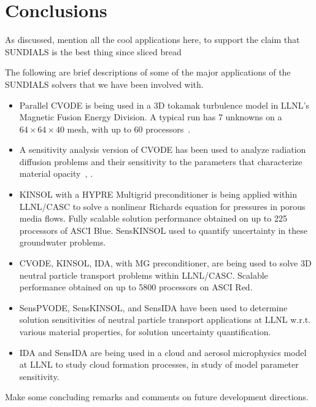 \section{Conclusions}\label{s:conclusions}

{\sf As discussed, mention all the cool applications here, to support
the claim that SUNDIALS is the best thing since sliced bread}

The following are brief descriptions of some of the major applications
of the SUNDIALS solvers that we have been involved with.

\begin{itemize}

\item Parallel CVODE is being used in a 3D tokamak turbulence model in
LLNL's Magnetic Fusion Energy Division.  A typical run has 7 unknowns
on a $64 \times 64 \times 40$ mesh, with up to 60 processors~\cite{RXH:02}.

\item A sensitivity analysis version of CVODE has been used to analyze
radiation diffusion problems and their sensitivity to the parameters that
characterize material opacity~\cite{LWG:03}, \cite{LHB:00}.

\item KINSOL with a HYPRE Multigrid preconditioner is being applied within
LLNL/CASC to solve a nonlinear Richards equation for pressures in
porous media flows.  Fully scalable solution performance obtained on
up to 225 processors of ASCI Blue.  SensKINSOL used to quantify
uncertainty in these groundwater problems.

\item CVODE, KINSOL, IDA, with MG preconditioner, are being used to
solve 3D neutral particle transport problems within LLNL/CASC.
Scalable performance obtained on up to 5800 processors on ASCI Red.

\item SensPVODE, SensKINSOL, and SensIDA have been used to determine
solution sensitivities of neutral particle transport applications at
LLNL w.r.t. various material properties, for solution uncertainty
quantification.

\item IDA and SensIDA are being used in a cloud and aerosol microphysics
model at LLNL to study cloud formation processes, in study of model
parameter sensitivity.

\end{itemize}

{\sf Make some concluding remarks and comments on future development 
directions.}



